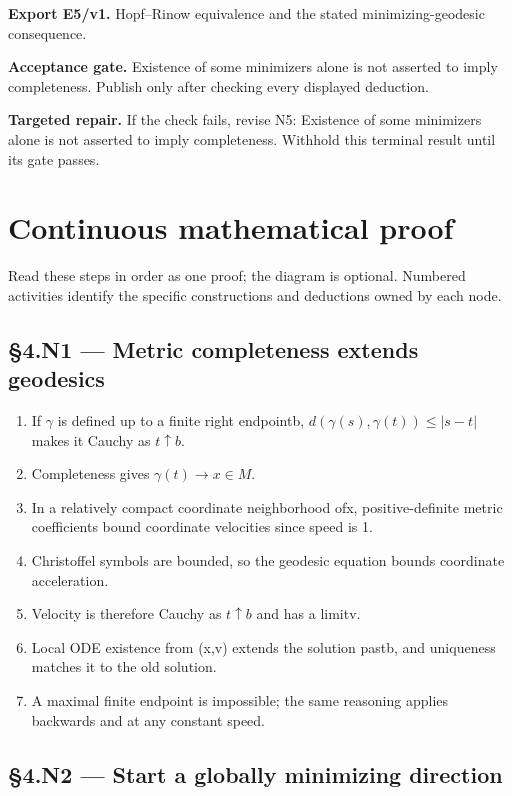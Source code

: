 \documentclass[preprint,12pt,aps,pra,showkeys,amsmath,amssymb,superscriptaddress,floatfix]{revtex4-2}
\theoremstyle{definition}
\theoremstyle{remark}
\newcommand{\field}[2]{\par\smallskip\noindent\textbf{#1.} #2\par}
\begin{document}
\field{Export E5/v1}{Hopf--Rinow equivalence and the stated minimizing-geodesic consequence.}

\field{Acceptance gate}{Existence of some minimizers alone is not asserted to imply
completeness. Publish only after checking every displayed deduction.}

\field{Targeted repair}{If the check fails, revise N5: Existence of some minimizers alone is not
asserted to imply completeness. Withhold this terminal result until its
gate passes.}

\endgroup\clearpage\section{Continuous mathematical proof}\label{sec:proof}

Read these steps in order as one proof; the diagram is optional.
Numbered activities identify the specific constructions and deductions
owned by each node.

\subsection{§4.N1 --- Metric completeness extends
geodesics}\label{n1-metric-completeness-extends-geodesics}

\begin{enumerate}
\def\labelenumi{\arabic{enumi}.}
\item
  If \(\gamma\) is defined up to a finite right endpointb,
  \(d(\gamma (s),\gamma (t))\le |s-t|\) makes it Cauchy as
  \(t\uparrow b\).
\item
  Completeness gives \(\gamma (t)\to x\in M\).
\item
  In a relatively compact coordinate neighborhood ofx, positive-definite
  metric coefficients bound coordinate velocities since speed is 1.
\item
  Christoffel symbols are bounded, so the geodesic equation bounds
  coordinate acceleration.
\item
  Velocity is therefore Cauchy as \(t\uparrow b\) and has a limitv.
\item
  Local ODE existence from (x,v) extends the solution pastb, and
  uniqueness matches it to the old solution.
\item
  A maximal finite endpoint is impossible; the same reasoning applies
  backwards and at any constant speed.
\end{enumerate}

\subsection{§4.N2 --- Start a globally minimizing
direction}\label{n2-start-a-globally-minimizing-direction}
\end{document}
